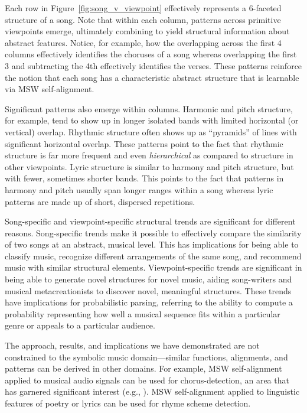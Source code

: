 \documentclass[phd,electronic,oneside,twosidetoc,letterpaper,chaptercenter,parttop,lof,lot]{byumsphd}
\begin{document}
Each row in Figure~\ref{fig:song_v_viewpoint} effectively represents a 6-faceted structure of a song. Note that within each column, patterns across primitive viewpoints emerge, ultimately combining to yield structural information about abstract features. Notice, for example, how the overlapping across the first 4 columns effectively identifies the choruses of a song whereas overlapping the first 3 and subtracting the 4th effectively identifies the verses. These patterns reinforce the notion that each song has a characteristic abstract structure that is learnable via MSW self-alignment.

Significant patterns also emerge within columns. Harmonic and pitch structure, for example, tend to show up in longer isolated bands with limited horizontal (or vertical) overlap. Rhythmic structure often shows up as ``pyramids'' of lines with significant horizontal overlap. These patterns point to the fact that rhythmic structure is far more frequent and even \textit{hierarchical} as compared to structure in other viewpoints. Lyric structure is similar to harmony and pitch structure, but with fewer, sometimes shorter bands. This points to the fact that patterns in harmony and pitch usually span longer ranges within a song whereas lyric patterns are made up of short, dispersed repetitions.

Song-specific and viewpoint-specific structural trends are significant for different reasons. Song-specific trends make it possible to effectively compare the similarity of two songs at an abstract, musical level. This has implications for being able to classify music, recognize different arrangements of the same song, and recommend music with similar structural elements. Viewpoint-specific trends are significant in being able to generate novel structures for novel music, aiding song-writers and musical metacreationists to discover novel, meaningful structures. These trends have implications for probabilistic parsing, referring to the ability to compute a probability representing how well a musical sequence fits within a particular genre or appeals to a particular audience.

The approach, results, and implications we have demonstrated are not constrained to the symbolic music domain---similar functions, alignments, and patterns can be derived in other domains. For example, MSW self-alignment applied to musical audio signals can be used for chorus-detection, an area that has garnered significant interest (e.g., \cite{gao2015octave}). MSW self-alignment applied to linguistic features of poetry or lyrics can be used for rhyme scheme detection.
\end{document}
